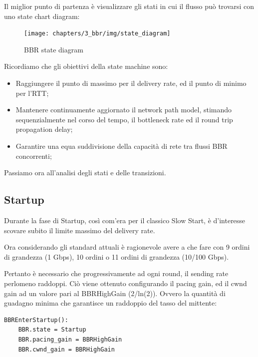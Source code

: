 Il miglior punto di partenza è visualizzare gli stati in cui il flusso può trovarsi con uno state chart diagram:

\begin{figure}[H]

\center
\caption{BBR state diagram}
\texttt{[image: chapters/3\_bbr/img/state\_diagram]}

\end{figure}

Ricordiamo che gli obiettivi della state machine sono:

\begin{itemize}

\item Raggiungere il punto di massimo per il delivery rate, ed il punto di minimo per l'RTT;

\item Mantenere continuamente aggiornato il network path model, stimando sequenzialmente nel corso del tempo, il bottleneck rate ed il round trip propagation delay;

\item Garantire una equa suddivisione della capacità di rete tra flussi BBR concorrenti;

\end{itemize}

Passiamo ora all'analisi degli stati e delle transizioni.

\subsection{Startup}

Durante la fase di Startup, così com'era per il classico Slow Start, è d'interesse scovare subito il limite massimo del delivery rate. \bigskip

Ora considerando gli standard attuali è ragionevole avere a che fare con 9 ordini di grandezza (1 Gbps), 10 ordini o 11 ordini di grandezza (10/100 Gbps). \bigskip

Pertanto è necessario che progressivamente ad ogni round, il sending rate perlomeno raddoppi. Ciò viene ottenuto configurando il pacing gain, ed il cwnd gain ad un valore pari al BBRHighGain (2/ln(2)). Ovvero la quantità di guadagno minima che garantisce un raddoppio del tasso del mittente:

\begin{lstlisting}[caption=BBREnterStartup]
BBREnterStartup():
	BBR.state = Startup
	BBR.pacing_gain = BBRHighGain
	BBR.cwnd_gain = BBRHighGain

\end{lstlisting}


